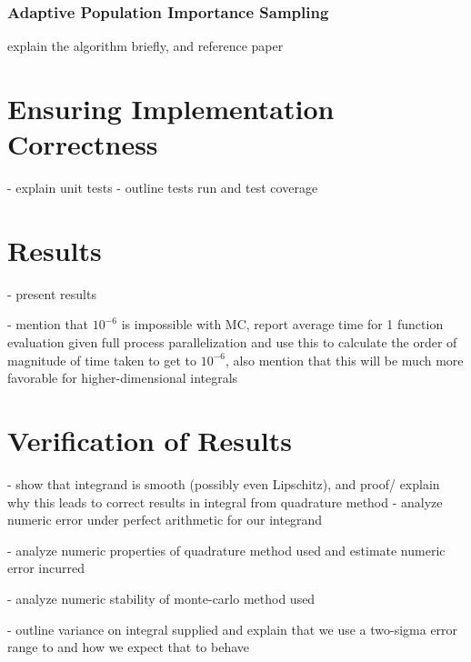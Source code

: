 \documentclass[10pt, a4paper]{article}
\begin{document}


  \subsubsection{Adaptive Population Importance Sampling}
  explain the \apis{} algorithm briefly, and reference paper

\section{Ensuring Implementation Correctness}

- explain unit tests
- outline tests run and test coverage

\section{Results}

- present results

- mention that $10^{-6}$ is impossible with MC, report average time for 1 function evaluation given
  full process parallelization and use this to calculate the order of magnitude of time taken to
  get to $10^{-6}$, also mention that this will be much more favorable for higher-dimensional integrals

\section{Verification of Results}

- show that integrand is smooth (possibly even Lipschitz), and proof/ explain why this leads to
  correct results in integral from quadrature method
  - analyze numeric error under perfect arithmetic for our integrand

- analyze numeric properties of quadrature method used and estimate numeric error incurred

- analyze numeric stability of monte-carlo method used

- outline variance on integral supplied and explain that we use a two-sigma error range to
  and how we expect that to behave
\end{document}
